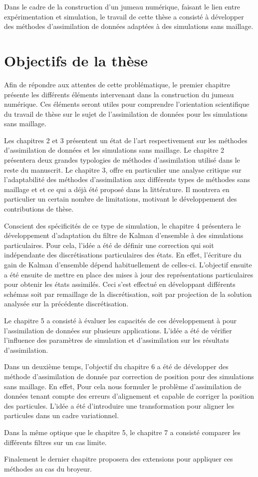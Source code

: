 Dans le cadre de la construction d'un jumeau numérique, faisant le lien entre expérimentation et simulation, le travail de cette thèse a consisté à développer des méthodes d'assimilation de données adaptées à des simulations sans maillage.

\section{Objectifs de la thèse}

Afin de répondre aux attentes de cette problématique, le premier chapitre présente les différents éléments intervenant dans la construction du jumeau numérique. Ces éléments seront utiles pour comprendre l'orientation scientifique du travail de thèse sur le sujet de l'assimilation de données pour les simulations sans maillage.

Les chapitres 2 et 3 présentent un état de l'art respectivement sur les méthodes d'assimilation de données et les simulations sans maillage. Le chapitre 2 présentera deux grandes typologies de méthodes d'assimilation utilisé dans le reste du manuscrit. Le chapitre 3, offre en particulier une analyse critique sur l'adaptabilité des méthodes d'assimilation aux différents types de méthodes sans maillage et et ce qui a déjà été proposé dans la littérature. Il montrera en particulier un certain nombre de limitations, motivant le développement des contributions de thèse.

Conscient des spécificités de ce type de simulation, le chapitre 4 présentera le développement d'adaptation du filtre de Kalman d'ensemble à des simulations particulaires. Pour cela, l'idée a été de définir une correction qui soit indépendante des discrétisations particulaires des états. En effet, l'écriture du gain de Kalman d'ensemble dépend habituellement de celles-ci. L’objectif ensuite a été ensuite de mettre en place des mises à jour des représentations particulaires pour obtenir les états assimilés. Ceci s’est effectué en développant différents schémas soit par remaillage de la discrétisation, soit par projection de la solution analysée sur la précédente discrétisation.

Le chapitre 5 a consisté à évaluer les capacités de ces développement à pour l'assimilation de données sur plusieurs applications. L'idée a été de vérifier l'influence des paramètres de simulation et d'assimilation sur les résultats d'assimilation.

Dans un deuxième temps, l'objectif du chapitre 6 a été de développer des méthode d'assimilation de donnée par correction de position pour des simulations sans maillage. En effet, Pour cela nous formuler le problème d'assimilation de données tenant compte des erreurs d'alignement et capable de corriger la position des particules. L'idée a été d'introduire une transformation pour aligner les particules dans un cadre variationnel.

Dans la même optique que le chapitre 5, le chapitre 7 a consisté comparer les différents filtres sur un cas limite.

Finalement le dernier chapitre proposera des extensions pour appliquer ces méthodes au cas du broyeur.